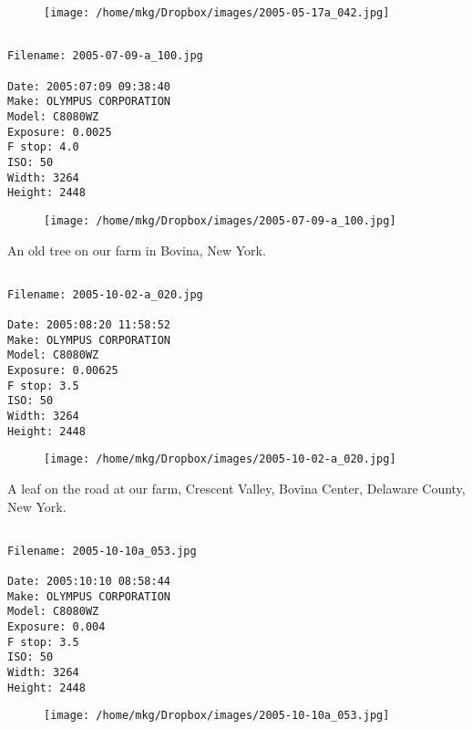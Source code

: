 \begin{figure}
\texttt{[image: /home/mkg/Dropbox/images/2005-05-17a\_042.jpg]}
\end{figure}
    
\clearpage
\onecolumn
\noindent 
\noindent
\begin{lstlisting}

Filename: 2005-07-09-a_100.jpg

Date: 2005:07:09 09:38:40
Make: OLYMPUS CORPORATION
Model: C8080WZ
Exposure: 0.0025
F stop: 4.0
ISO: 50
Width: 3264
Height: 2448
\end{lstlisting}
\clearpage

\begin{figure}
\texttt{[image: /home/mkg/Dropbox/images/2005-07-09-a\_100.jpg]}
\end{figure}
    
\clearpage
\onecolumn
\noindent An old tree on our farm in Bovina, New York.
\noindent
\begin{lstlisting}

Filename: 2005-10-02-a_020.jpg

Date: 2005:08:20 11:58:52
Make: OLYMPUS CORPORATION
Model: C8080WZ
Exposure: 0.00625
F stop: 3.5
ISO: 50
Width: 3264
Height: 2448
\end{lstlisting}
\clearpage

\begin{figure}
\texttt{[image: /home/mkg/Dropbox/images/2005-10-02-a\_020.jpg]}
\end{figure}
    
\clearpage
\onecolumn
\noindent A leaf on the road at our farm, Crescent Valley, Bovina Center, Delaware County, New York.
\noindent
\begin{lstlisting}

Filename: 2005-10-10a_053.jpg

Date: 2005:10:10 08:58:44
Make: OLYMPUS CORPORATION
Model: C8080WZ
Exposure: 0.004
F stop: 3.5
ISO: 50
Width: 3264
Height: 2448
\end{lstlisting}
\clearpage

\begin{figure}
\texttt{[image: /home/mkg/Dropbox/images/2005-10-10a\_053.jpg]}
\end{figure}
    
